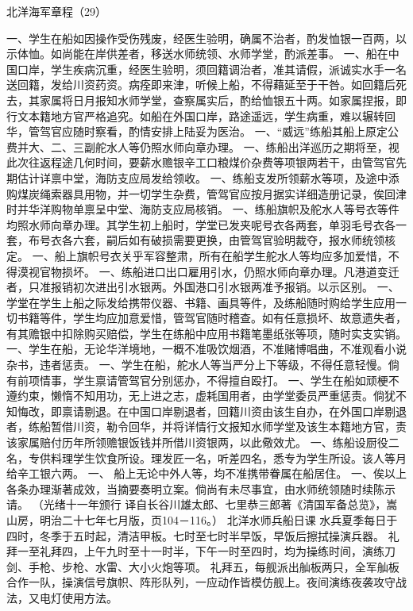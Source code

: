 \documentclass[12pt,UTF8]{ctexbook}
\begin{document}
北洋海军章程（29）

一、学生在船如因操作受伤残废，经医生验明，确属不治者，酌发恤银一百两，以示体恤。如尚能在岸供差者，移送水师统领、水师学堂，酌派差事。
一、船在中国口岸，学生疾病沉重，经医生验明，须回籍调治者，准其请假，派诚实水手一名送回籍，发给川资药资。病痊即来津，听候上船，不得藉延至于干咎。如回籍后死去，其家属将日月报知水师学堂，查察属实后，酌给恤银五十两。如家属捏报，即行文本籍地方官严格追究。如船在外国口岸，路途遥远，学生病重，难以辗转回华，管驾官应随时察看，酌情安排上陆妥为医治。
一、“威远”练船其船上原定公费并大、二、三副舵水人等仍照水师向章办理。
一、练船出洋巡历之期将至，视此次往返程途几何时间，要薪水赡银辛工口粮煤价杂费等项银两若干，由管驾官先期估计详禀中堂，海防支应局发给领收。
一、练船支发所领薪水等项，及途中添购煤炭绳索器具用物，并一切学生杂费，管驾官应按月据实详细造册记录，俟回津时并华洋购物单禀呈中堂、海防支应局核销。
一、练船旗帜及舵水人等号衣等件均照水师向章办理。其学生初上船时，学堂已发夹呢号衣各两套，单羽毛号衣各一套，布号衣各六套，嗣后如有破损需要更换，由管驾官验明裁夺，报水师统领核定。
一、船上旗帜号衣关乎军容整肃，所有在船学生舵水人等均应多加爱惜，不得漠视官物损坏。
一、练船进口出口雇用引水，仍照水师向章办理。凡港道变迁者，只准报销初次进出引水银两。外国港口引水银两准予报销。以示区别。
一、学堂在学生上船之际发给携带仪器、书籍、画具等件，及练船随时购给学生应用一切书籍等件，学生均应加意爱惜，管驾官随时稽查。如有任意损坏、故意遗失者，有其赡银中扣除购买赔偿，学生在练船中应用书籍笔墨纸张等项，随时实支实销。
一、学生在船，无论华洋境地，一概不准吸饮烟酒，不准赌博唱曲，不准观看小说杂书，违者惩责。
一、学生在船，舵水人等当严分上下等级，不得任意轻慢。倘有前项情事，学生禀请管驾官分别惩办，不得擅自殴打。
一、学生在船如顽梗不遵约束，懒惰不知用功，无上进之志，虚耗国用者，由学堂委员严重惩责。倘犹不知悔改，即禀请剔退。在中国口岸剔退者，回籍川资由该生自办，在外国口岸剔退者，练船暂借川资，勒令回华，并将详情行文报知水师学堂及该生本籍地方官，责该家属赔付历年所领赡银饭钱并所借川资银两，以此儆效尤。
一、练船设厨役二名，专供料理学生饮食所设。理发匠一名，听差四名，悉专为学生所设。该人等月给辛工银六两。
一、 船上无论中外人等，均不准携带眷属在船居住。
一、俟以上各条办理渐著成效，当摘要奏明立案。倘尚有未尽事宜，由水师统领随时续陈示请。
（光绪十一年颁行 译自长谷川雄太郎、七里恭三郎著《清国军备总览》，嵩山房，明治二十七年七月版，页104－116。）
北洋水师兵船日课
水兵夏季每日于四时，冬季于五时起，清洁甲板。七时至七时半早饭，早饭后擦拭操演兵器。
礼拜一至礼拜四，上午九时至十一时半，下午一时至四时，均为操练时间，演练刀剑、手枪、步枪、水雷、大小火炮等项。
礼拜五，每舰派出舢板两只，全军舢板合作一队，操演信号旗帜、阵形队列，一应动作皆模仿舰上。夜间演练夜袭攻守战法，又电灯使用方法。
\end{document}
